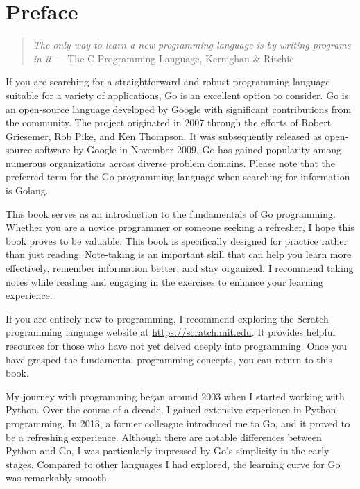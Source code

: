 \cleardoublepage
{}
\chapter*{Preface}

\begin{quote}
\textit{The only way to learn a new programming language is by writing programs in it}
--- The C Programming Language, Kernighan \& Ritchie
\end{quote}

If you are searching for a straightforward and robust programming language
suitable for a variety of applications, Go is an excellent option to consider.
Go is an open-source language developed by Google with significant contributions
from the community. The project originated in 2007 through the efforts of Robert
Griesemer, Rob Pike, and Ken Thompson. It was subsequently released as
open-source software by Google in November 2009. Go has gained popularity among
numerous organizations across diverse problem domains. Please note that the
preferred term for the Go programming language when searching for information is
Golang.

This book serves as an introduction to the fundamentals of Go programming.
Whether you are a novice programmer or someone seeking a refresher, I hope this
book proves to be valuable. This book is specifically designed for practice
rather than just reading. Note-taking is an important skill that can help you
learn more effectively, remember information better, and stay organized. I
recommend taking notes while reading and engaging in the exercises to enhance
your learning experience.

If you are entirely new to programming, I recommend exploring the Scratch
programming language website at \url{https://scratch.mit.edu}. It provides
helpful resources for those who have not yet delved deeply into programming.
Once you have grasped the fundamental programming concepts, you can return to
this book.

My journey with programming began around 2003 when I started working with
Python. Over the course of a decade, I gained extensive experience in Python
programming. In 2013, a former colleague introduced me to Go, and it proved to
be a refreshing experience. Although there are notable differences between
Python and Go, I was particularly impressed by Go's simplicity in the early
stages. Compared to other languages I had explored, the learning curve for Go
was remarkably smooth.

